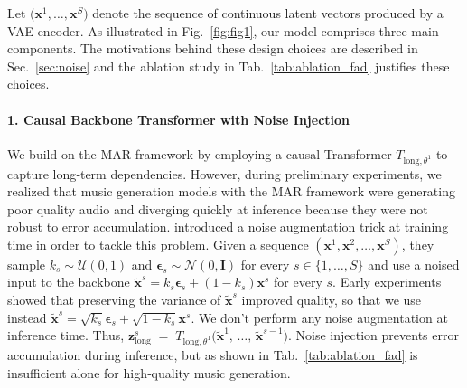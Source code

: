 Let $\bigl(\mathbf{x}^1, \ldots, \mathbf{x}^S\bigr)$ denote the sequence of continuous latent vectors produced by a VAE encoder.  As illustrated in Fig.~\ref{fig:fig1}, our model comprises three main components. The motivations behind these design choices are described in Sec.~\ref{sec:noise} and the ablation study in Tab.~\ref{tab:ablation_fad} justifies these choices.

\paragraph{1. Causal Backbone Transformer with Noise Injection}
We build on the MAR framework \citep{autoreg_image_quant} by employing a causal Transformer $T_{\text{long}, \theta^1}$ to capture long‑term dependencies. However, during preliminary experiments, we realized that music generation models with the MAR framework were generating poor quality audio and diverging quickly at inference because they were not robust to error accumulation. 
\citet{sony_trick} introduced a noise augmentation trick at training time in order to tackle this problem. Given a sequence $(\mathbf{x}^1, \mathbf{x}^2, \ldots, \mathbf{x}^S)$, they sample $k_s \sim \mathcal{U}(0, 1)$ and $\bm{\epsilon}_s \sim \mathcal{N}(0, \mathbf{I})$ for every $s \in \{1, \ldots, S\}$ and use a noised input to the backbone $\tilde{\mathbf{x}}^s = k_s  \bm{\epsilon}_s + (1 - k_s) \mathbf{x}^s$ for every $s$. Early experiments showed that preserving the variance of $\tilde{\mathbf{x}}^s$ improved quality, so that we use instead
$\tilde{\mathbf{x}}^s = \sqrt{k_s}  \bm{\epsilon}_s + \sqrt{1 - k_s} \mathbf{x}^s$. We don't perform any noise augmentation at inference time. Thus, $\mathbf{z}_{\text{long}}^s \;=\; T_{\text{long}, \theta^1}\bigl(\tilde{\mathbf{x}}^1,\,\ldots,\,\tilde{\mathbf{x}}^{s-1}\bigr)$.
Noise injection prevents error accumulation during inference, but as shown in Tab.~\ref{tab:ablation_fad} is insufficient alone for high‑quality music generation.


